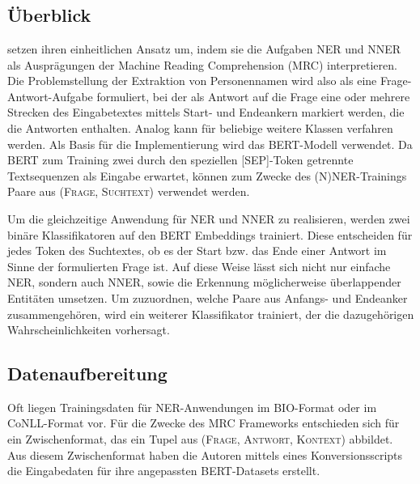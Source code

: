 

\chapter{}
\label{ch:MRC}


\section{Überblick}
\label{ch:MRC:sec:Überblick}

 setzen ihren einheitlichen Ansatz um, indem sie die Aufgaben NER und NNER als Ausprägungen der Machine Reading Comprehension (MRC) interpretieren. Die Problemstellung der Extraktion von Personennamen wird also als eine Frage-Antwort-Aufgabe formuliert, bei der als Antwort auf die Frage \emph{} eine oder mehrere Strecken des Eingabetextes mittels Start- und Endeankern markiert werden, die die Antworten enthalten. Analog kann für beliebige weitere Klassen verfahren werden. Als Basis für die Implementierung wird das BERT-Modell \parencite{devlin2019bert} verwendet. Da BERT zum Training zwei durch den speziellen [SEP]-Token getrennte Textsequenzen als Eingabe erwartet, können zum Zwecke des (N)NER-Trainings Paare aus \textsc{(Frage, Suchtext)} verwendet werden.

Um die gleichzeitige Anwendung für NER und NNER zu realisieren, werden zwei binäre Klassifikatoren auf den BERT Embeddings trainiert. Diese entscheiden für jedes Token des Suchtextes, ob es der Start bzw. das Ende einer Antwort im Sinne der formulierten Frage ist. Auf diese Weise lässt sich nicht nur einfache NER, sondern auch NNER, sowie die Erkennung möglicherweise überlappender Entitäten umsetzen. Um zuzuordnen, welche Paare aus Anfangs- und Endeanker zusammengehören, wird ein weiterer Klassifikator trainiert, der die dazugehörigen Wahrscheinlichkeiten vorhersagt.

\section{Datenaufbereitung}
\label{ch:MRC:sec:Datenaufbereitung}

Oft liegen Trainingsdaten für NER-Anwendungen im BIO-Format oder im CoNLL-Format vor. Für die Zwecke des MRC Frameworks entschieden sich  für ein Zwischenformat, das ein Tupel aus \textsc{(Frage, Antwort, Kontext)} abbildet. Aus diesem Zwischenformat haben die Autoren mittels eines Konversionsscripts die Eingabedaten für ihre angepassten BERT-Datasets erstellt.

